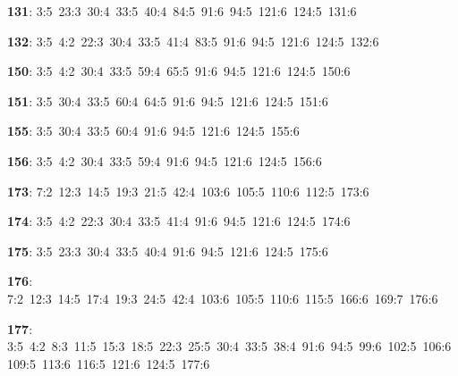 \noindent \textbf{131}: 3:5\allowbreak\ 23:3\allowbreak\ 30:4\allowbreak\ 33:5\allowbreak\ 40:4\allowbreak\ 84:5\allowbreak\ 91:6\allowbreak\ 94:5\allowbreak\ 121:6\allowbreak\ 124:5\allowbreak\ 131:6\par
\noindent \textbf{132}: 3:5\allowbreak\ 4:2\allowbreak\ 22:3\allowbreak\ 30:4\allowbreak\ 33:5\allowbreak\ 41:4\allowbreak\ 83:5\allowbreak\ 91:6\allowbreak\ 94:5\allowbreak\ 121:6\allowbreak\ 124:5\allowbreak\ 132:6\par
\noindent \textbf{150}: 3:5\allowbreak\ 4:2\allowbreak\ 30:4\allowbreak\ 33:5\allowbreak\ 59:4\allowbreak\ 65:5\allowbreak\ 91:6\allowbreak\ 94:5\allowbreak\ 121:6\allowbreak\ 124:5\allowbreak\ 150:6\par
\noindent \textbf{151}: 3:5\allowbreak\ 30:4\allowbreak\ 33:5\allowbreak\ 60:4\allowbreak\ 64:5\allowbreak\ 91:6\allowbreak\ 94:5\allowbreak\ 121:6\allowbreak\ 124:5\allowbreak\ 151:6\par
\noindent \textbf{155}: 3:5\allowbreak\ 30:4\allowbreak\ 33:5\allowbreak\ 60:4\allowbreak\ 91:6\allowbreak\ 94:5\allowbreak\ 121:6\allowbreak\ 124:5\allowbreak\ 155:6\par
\noindent \textbf{156}: 3:5\allowbreak\ 4:2\allowbreak\ 30:4\allowbreak\ 33:5\allowbreak\ 59:4\allowbreak\ 91:6\allowbreak\ 94:5\allowbreak\ 121:6\allowbreak\ 124:5\allowbreak\ 156:6\par
\noindent \textbf{173}: 7:2\allowbreak\ 12:3\allowbreak\ 14:5\allowbreak\ 19:3\allowbreak\ 21:5\allowbreak\ 42:4\allowbreak\ 103:6\allowbreak\ 105:5\allowbreak\ 110:6\allowbreak\ 112:5\allowbreak\ 173:6\par
\noindent \textbf{174}: 3:5\allowbreak\ 4:2\allowbreak\ 22:3\allowbreak\ 30:4\allowbreak\ 33:5\allowbreak\ 41:4\allowbreak\ 91:6\allowbreak\ 94:5\allowbreak\ 121:6\allowbreak\ 124:5\allowbreak\ 174:6\par
\noindent \textbf{175}: 3:5\allowbreak\ 23:3\allowbreak\ 30:4\allowbreak\ 33:5\allowbreak\ 40:4\allowbreak\ 91:6\allowbreak\ 94:5\allowbreak\ 121:6\allowbreak\ 124:5\allowbreak\ 175:6\par
\noindent \textbf{176}: 7:2\allowbreak\ 12:3\allowbreak\ 14:5\allowbreak\ 17:4\allowbreak\ 19:3\allowbreak\ 24:5\allowbreak\ 42:4\allowbreak\ 103:6\allowbreak\ 105:5\allowbreak\ 110:6\allowbreak\ 115:5\allowbreak\ 166:6\allowbreak\ 169:7\allowbreak\ 176:6\par
\noindent \textbf{177}: 3:5\allowbreak\ 4:2\allowbreak\ 8:3\allowbreak\ 11:5\allowbreak\ 15:3\allowbreak\ 18:5\allowbreak\ 22:3\allowbreak\ 25:5\allowbreak\ 30:4\allowbreak\ 33:5\allowbreak\ 38:4\allowbreak\ 91:6\allowbreak\ 94:5\allowbreak\ 99:6\allowbreak\ 102:5\allowbreak\ 106:6\allowbreak\ 109:5\allowbreak\ 113:6\allowbreak\ 116:5\allowbreak\ 121:6\allowbreak\ 124:5\allowbreak\ 177:6\par
